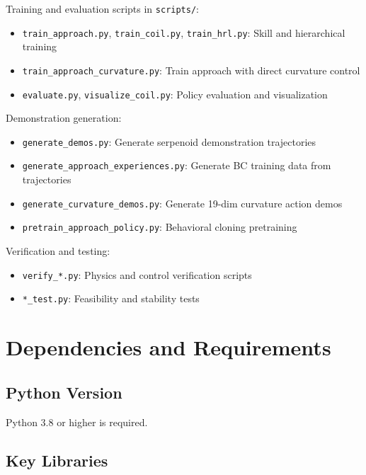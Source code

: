 \documentclass[11pt]{article}
\begin{document}
Training and evaluation scripts in \texttt{scripts/}:
\begin{itemize}
    \item \texttt{train\_approach.py}, \texttt{train\_coil.py}, \texttt{train\_hrl.py}: Skill and hierarchical training
    \item \texttt{train\_approach\_curvature.py}: Train approach with direct curvature control
    \item \texttt{evaluate.py}, \texttt{visualize\_coil.py}: Policy evaluation and visualization
\end{itemize}
Demonstration generation:
\begin{itemize}
    \item \texttt{generate\_demos.py}: Generate serpenoid demonstration trajectories
    \item \texttt{generate\_approach\_experiences.py}: Generate BC training data from trajectories
    \item \texttt{generate\_curvature\_demos.py}: Generate 19-dim curvature action demos
    \item \texttt{pretrain\_approach\_policy.py}: Behavioral cloning pretraining
\end{itemize}
Verification and testing:
\begin{itemize}
    \item \texttt{verify\_*.py}: Physics and control verification scripts
    \item \texttt{*\_test.py}: Feasibility and stability tests
\end{itemize}

\section{Dependencies and Requirements}

\subsection{Python Version}

Python 3.8 or higher is required.

\subsection{Key Libraries}
\end{document}
